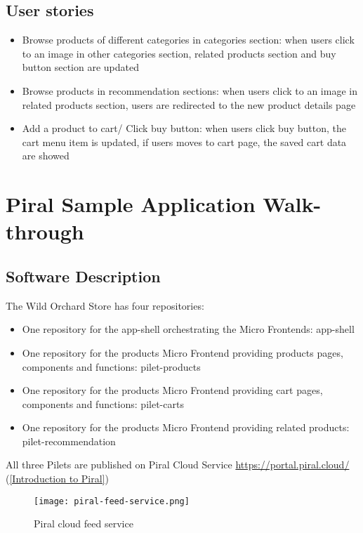 \documentclass[a4paper]{book}
\begin{document}
\subsection{User stories}

\begin{itemize}
    \item Browse products of different categories in categories section: when users click to an image in other categories section, related products section and buy button section are updated
    \item Browse products in recommendation sections: when users click to an image in related products section, users are redirected to the new product details page
    \item Add a product to cart/ Click buy button: when users click buy button, the cart menu item is updated, if users moves to cart page, the saved cart data are showed
\end{itemize}

\section{Piral Sample Application Walk-through} \label{Piral Application}
\subsection{Software Description}
The Wild Orchard Store has four repositories:
\begin{itemize}
    \item One repository for the app-shell orchestrating the Micro Frontends: app-shell
    \item One repository for the products Micro Frontend providing products pages, components and functions: pilet-products
    \item One repository for the products Micro Frontend providing cart pages, components and functions: pilet-carts
    \item One repository for the products Micro Frontend providing related products: pilet-recommendation
\end{itemize}
			
All three Pilets are published on Piral Cloud Service \url{https://portal.piral.cloud/ } (\ref{Introduction to Piral})
\begin{figure}[h!]
  \centering
  \captionsetup{justification=centering}
  \texttt{[image: piral-feed-service.png]}
   \caption{Piral cloud feed service}
  \label{fig:9}
\end{figure}
\end{document}
